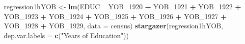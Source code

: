 \documentclass[
  12pt,
  landscape]{article}
\newenvironment{Shaded}{\begin{snugshade}}{\end{snugshade}}
\newcommand{\DataTypeTok}[1]{\textcolor[rgb]{0.13,0.29,0.53}{#1}}
\newcommand{\DecValTok}[1]{\textcolor[rgb]{0.00,0.00,0.81}{#1}}
\newcommand{\KeywordTok}[1]{\textcolor[rgb]{0.13,0.29,0.53}{\textbf{#1}}}
\newcommand{\NormalTok}[1]{#1}
\newcommand{\OperatorTok}[1]{\textcolor[rgb]{0.81,0.36,0.00}{\textbf{#1}}}
\newcommand{\StringTok}[1]{\textcolor[rgb]{0.31,0.60,0.02}{#1}}
\begin{document}
\begin{Shaded}
\begin{Highlighting}[]
\NormalTok{regression1hYOB <-}\StringTok{ }\KeywordTok{lm}\NormalTok{(EDUC }\OperatorTok{~}\StringTok{ }\NormalTok{YOB_}\DecValTok{1920} \OperatorTok{+}\StringTok{ }\NormalTok{YOB_}\DecValTok{1921} \OperatorTok{+}\StringTok{ }\NormalTok{YOB_}\DecValTok{1922} \OperatorTok{+}\StringTok{ }\NormalTok{YOB_}\DecValTok{1923} \OperatorTok{+}\StringTok{ }\NormalTok{YOB_}\DecValTok{1924} \OperatorTok{+}\StringTok{ }\NormalTok{YOB_}\DecValTok{1925} \OperatorTok{+}\StringTok{ }\NormalTok{YOB_}\DecValTok{1926} \OperatorTok{+}\StringTok{ }\NormalTok{YOB_}\DecValTok{1927} \OperatorTok{+}\StringTok{ }\NormalTok{YOB_}\DecValTok{1928} \OperatorTok{+}\StringTok{ }\NormalTok{YOB_}\DecValTok{1929}\NormalTok{, }\DataTypeTok{data =}\NormalTok{ census)}
\KeywordTok{stargazer}\NormalTok{(regression1hYOB,}
        \DataTypeTok{dep.var.labels =} \KeywordTok{c}\NormalTok{(}\StringTok{"Years of Education"}\NormalTok{))}
\end{Highlighting}
\end{Shaded}
\end{document}
